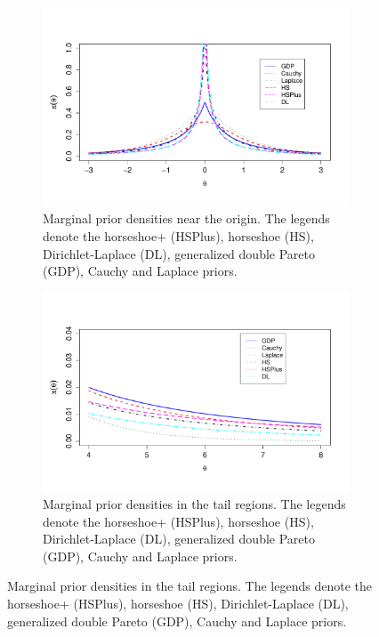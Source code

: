 \documentclass[11pt]{article}
\numberwithin{equation}{section}
\begin{document}
\begin{figure}[ht!]
  \centering 
  \begin{subfigure}{0.45\linewidth}
	\includegraphics[width=\textwidth]{figs/densities_zero_new}%
	\caption{Marginal prior densities near the origin. The legends denote the horseshoe+ (HSPlus), horseshoe (HS), Dirichlet-Laplace (DL), generalized double Pareto (GDP), Cauchy and Laplace priors.}
	\label{fig:zero}
	\end{subfigure}
  \begin{subfigure}{0.45\linewidth}
	\includegraphics[width=\textwidth]{figs/densities_tails_new}
 	 \caption{Marginal prior densities in the tail regions. The legends denote the horseshoe+ (HSPlus), horseshoe (HS), Dirichlet-Laplace (DL), generalized double Pareto (GDP), Cauchy and Laplace priors.}
  \label{fig:tails}
		\end{subfigure}
\end{figure}
\end{document}
